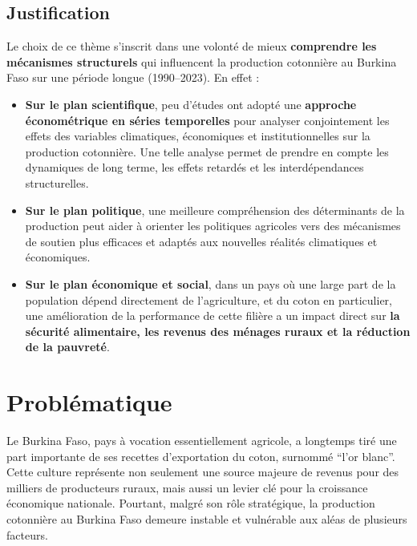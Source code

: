 \documentclass[
  letterpaper,
  DIV=11,
  numbers=noendperiod]{scrartcl}
\providecommand{\tightlist}{%
  \setlength{\itemsep}{0pt}\setlength{\parskip}{0pt}}\usepackage{longtable,booktabs,array}
\begin{document}
\subsection{Justification}\label{justification}

Le choix de ce thème s'inscrit dans une volonté de mieux
\textbf{comprendre les mécanismes structurels} qui influencent la
production cotonnière au Burkina Faso sur une période longue
(1990--2023). En effet :

\begin{itemize}
\tightlist
\item
  \textbf{Sur le plan scientifique}, peu d'études ont adopté une
  \textbf{approche économétrique en séries temporelles} pour analyser
  conjointement les effets des variables climatiques, économiques et
  institutionnelles sur la production cotonnière. Une telle analyse
  permet de prendre en compte les dynamiques de long terme, les effets
  retardés et les interdépendances structurelles.
\end{itemize}

\begin{itemize}
\tightlist
\item
  \textbf{Sur le plan politique}, une meilleure compréhension des
  déterminants de la production peut aider à orienter les politiques
  agricoles vers des mécanismes de soutien plus efficaces et adaptés aux
  nouvelles réalités climatiques et économiques.
\end{itemize}

\begin{itemize}
\tightlist
\item
  \textbf{Sur le plan économique et social}, dans un pays où une large
  part de la population dépend directement de l'agriculture, et du coton
  en particulier, une amélioration de la performance de cette filière a
  un impact direct sur \textbf{la sécurité alimentaire, les revenus des
  ménages ruraux et la réduction de la pauvreté}.
\end{itemize}

\section{Problématique}\label{probluxe9matique}

Le Burkina Faso, pays à vocation essentiellement agricole, a longtemps
tiré une part importante de ses recettes d'exportation du coton,
surnommé ``l'or blanc''. Cette culture représente non seulement une
source majeure de revenus pour des milliers de producteurs ruraux, mais
aussi un levier clé pour la croissance économique nationale. Pourtant,
malgré son rôle stratégique, la production cotonnière au Burkina Faso
demeure instable et vulnérable aux aléas de plusieurs facteurs.
\end{document}
